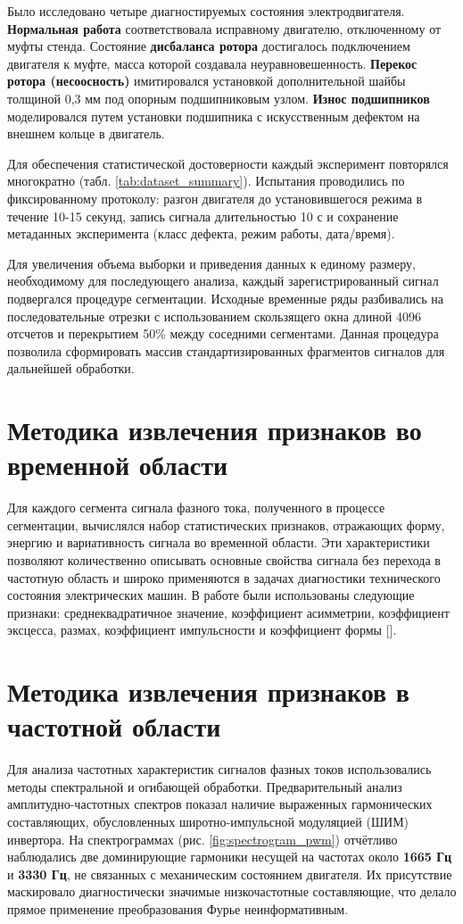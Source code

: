 Было исследовано четыре диагностируемых состояния электродвигателя. \textbf{Нормальная работа} соответствовала исправному двигателю, отключенному от муфты стенда. Состояние \textbf{дисбаланса ротора} достигалось подключением двигателя к муфте, масса которой создавала неуравновешенность. \textbf{Перекос ротора (несоосность)} имитировался установкой дополнительной шайбы толщиной 0,3 мм под опорным подшипниковым узлом. \textbf{Износ подшипников} моделировался путем установки подшипника с искусственным дефектом на внешнем кольце в двигатель.


Для обеспечения статистической достоверности каждый эксперимент повторялся многократно (табл. \ref{tab:dataset_summary}). Испытания проводились по фиксированному протоколу: разгон двигателя до установившегося режима в течение 10-15 секунд, запись сигнала длительностью 10 с и сохранение метаданных эксперимента (класс дефекта, режим работы, дата/время).

Для увеличения объема выборки и приведения данных к единому размеру, необходимому для последующего анализа, каждый зарегистрированный сигнал подвергался процедуре сегментации. Исходные временные ряды разбивались на последовательные отрезки с использованием скользящего окна длиной 4096 отсчетов и перекрытием 50\% между соседними сегментами. Данная процедура позволила сформировать массив стандартизированных фрагментов сигналов для дальнейшей обработки.

\section{Методика извлечения признаков во временной области}
Для каждого сегмента сигнала фазного тока, полученного в процессе сегментации, вычислялся набор статистических признаков, отражающих форму, энергию и вариативность сигнала во временной области. Эти характеристики позволяют количественно описывать основные свойства сигнала без перехода в частотную область и широко применяются в задачах диагностики технического состояния электрических машин. В работе были использованы следующие признаки: среднеквадратичное значение, коэффициент асимметрии, коэффициент эксцесса, размах, коэффициент импульсности и коэффициент формы [].

\section{Методика извлечения признаков в частотной области}
Для анализа частотных характеристик сигналов фазных токов использовались методы спектральной и огибающей обработки. Предварительный анализ амплитудно-частотных спектров показал наличие выраженных гармонических составляющих, обусловленных широтно-импульсной модуляцией (ШИМ) инвертора. На спектрограммах (рис. \ref{fig:spectrogram_pwm}) отчётливо наблюдались две доминирующие гармоники несущей на частотах около \textbf{1665 Гц} и \textbf{3330 Гц}, не связанных с механическим состоянием двигателя. Их присутствие маскировало диагностически значимые низкочастотные составляющие, что делало прямое применение преобразования Фурье неинформативным.

